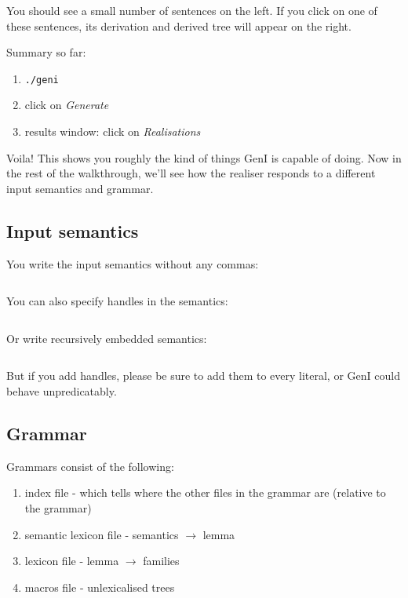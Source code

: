 \documentclass[11pt]{article}
\newcommand{\commandline}{\texttt}
\newcommand{\commandgui}{\textit}
\begin{document}
You should see a small number of sentences on the left. If you click on
one of these sentences, its derivation and derived tree will appear on
the right.

Summary so far:

\begin{enumerate}
\item \commandline{./geni}
\item click on \commandgui{Generate}
\item results window: click on \commandgui{Realisations}
\end{enumerate}

Voila! This shows you roughly the kind of things GenI is capable of
doing.  Now in the rest of the walkthrough, we'll see how the realiser
responds to a different input semantics and grammar.

\subsection{Input semantics}

You write the input semantics without any commas:
\begin{verbatim}
\end{verbatim}

You can also specify handles in the semantics:
\begin{verbatim}
\end{verbatim}

Or write recursively embedded semantics:
\begin{verbatim}
\end{verbatim}

But if you add handles, please be sure to add them to every literal,
or GenI could behave unpredicatably.

\subsection{Grammar}

Grammars consist of the following:

\begin{enumerate}
\item index file - which tells where the other files
      in the grammar are (relative to the grammar)
\item semantic lexicon file - semantics $\rightarrow$ lemma
\item lexicon file - lemma $\rightarrow$ families
\item macros file  - unlexicalised trees
\end{enumerate}
\end{document}
